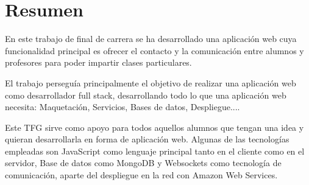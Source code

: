 \documentclass[oneside,a4paper,11pt]{book}
\begin{document}
\clearpage
\thispagestyle{empty}

\vspace{5cm}




\chapter*{Resumen}
\pagestyle{plain}

En este trabajo de final de carrera se ha desarrollado una aplicación web cuya funcionalidad principal es ofrecer el contacto y la comunicación entre alumnos y profesores para poder impartir clases particulares.

El trabajo perseguía principalmente el objetivo de realizar una aplicación web como desarrollador full stack, desarrollando todo lo que una aplicación web necesita: Maquetación, Servicios, Bases de datos, Despliegue....

Este TFG sirve como apoyo para todos aquellos alumnos que tengan una idea y quieran desarrollarla en forma de aplicación web. Algunas de las tecnologías empleadas son JavaScript como lenguaje principal tanto en el cliente como en el servidor, Base de datos como MongoDB y Websockets como tecnología de comunicación, aparte del despliegue en la red con Amazon Web Services.


\tableofcontents %

\listoffigures %
\end{document}
